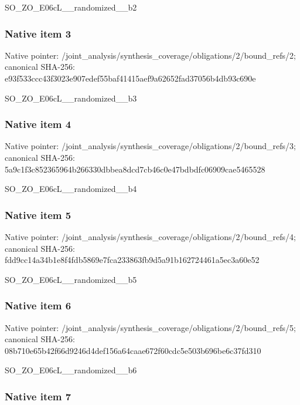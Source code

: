 \documentclass[10pt,a4paper]{article}
\begin{document}
SO\_ZO\_E06cL\_\_randomized\_\_b2


\subsubsection{Native item 3}


Native pointer: /joint\_analysis/synthesi\allowbreak{}s\_coverage/obligations/2\allowbreak{}/bound\_refs/2; canonical SHA-256: e93f533ccc43f3023e907ede\allowbreak{}f55baf41415aef9a62652fad\allowbreak{}37056b4db93c690e


SO\_ZO\_E06cL\_\_randomized\_\_b3


\subsubsection{Native item 4}


Native pointer: /joint\_analysis/synthesi\allowbreak{}s\_coverage/obligations/2\allowbreak{}/bound\_refs/3; canonical SHA-256: 5a9c1f3c852365964b266330\allowbreak{}dbbea8dcd7cb46c0e47bdbdf\allowbreak{}c06909cae5465528


SO\_ZO\_E06cL\_\_randomized\_\_b4


\subsubsection{Native item 5}


Native pointer: /joint\_analysis/synthesi\allowbreak{}s\_coverage/obligations/2\allowbreak{}/bound\_refs/4; canonical SHA-256: fdd9cc14a34b1e8f4fdb5869\allowbreak{}e7fca233863fb9d5a91b1627\allowbreak{}24461a5ec3a60e52


SO\_ZO\_E06cL\_\_randomized\_\_b5


\subsubsection{Native item 6}


Native pointer: /joint\_analysis/synthesi\allowbreak{}s\_coverage/obligations/2\allowbreak{}/bound\_refs/5; canonical SHA-256: 08b710e65b42f66d9246d4de\allowbreak{}f156a64caae672f60cdc5e50\allowbreak{}3b696be6c37fd310


SO\_ZO\_E06cL\_\_randomized\_\_b6


\subsubsection{Native item 7}
\end{document}
